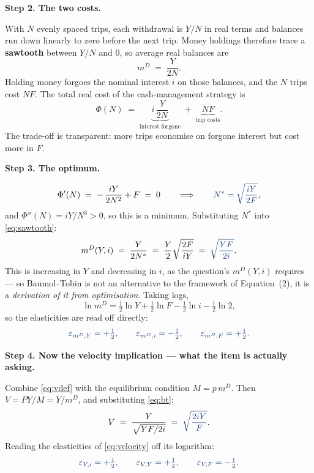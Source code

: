 \documentclass[11pt, a4paper]{article}
\newcommand{\passo}[1]{\medskip\noindent\textbf{#1}\par\nobreak}
\newcommand{\resp}[1]{%
  \ifmmode {\color{darkblue}#1}\else\textcolor{darkblue}{\textbf{#1}}\fi}
\newcommand{\md}{m^{D}}
\newcommand{\Nst}{N^{\ast}}
\begin{document}
\passo{Step 2. The two costs.}
With $N$ evenly spaced trips, each withdrawal is $Y/N$ in real terms and balances run down
linearly to zero before the next trip. Money holdings therefore trace a \textbf{sawtooth}
between $Y/N$ and $0$, so average real balances are
\begin{equation}
\md \;=\; \frac{Y}{2N}.
\label{eq:sawtooth}
\end{equation}
Holding money forgoes the nominal interest $i$ on those balances, and the $N$ trips cost $NF$.
The total real cost of the cash-management strategy is
\begin{equation}
\Phi(N) \;=\; \underbrace{i\,\frac{Y}{2N}}_{\text{interest forgone}} \;+\; \underbrace{NF}_{\text{trip costs}}.
\label{eq:cost}
\end{equation}
The trade-off is transparent: more trips economise on forgone interest but cost more in $F$.

\passo{Step 3. The optimum.}
\[
\Phi'(N) \;=\; -\,\frac{iY}{2N^{2}} + F \;=\; 0
\qquad\Longrightarrow\qquad
\resp{\Nst=\sqrt{\dfrac{iY}{2F}}},
\]
and $\Phi''(N)=iY/N^{3}>0$, so this is a minimum. Substituting $\Nst$ into
\eqref{eq:sawtooth}:
\begin{equation}
\md(Y,i) \;=\; \frac{Y}{2\Nst} \;=\; \frac{Y}{2}\sqrt{\frac{2F}{iY}}
\;=\; \resp{\sqrt{\frac{YF}{2i}}}.
\label{eq:bt}
\end{equation}
This is increasing in $Y$ and decreasing in $i$, as the question's $\md(Y,i)$ requires --- so
Baumol--Tobin is not an alternative to the framework of Equation~(2), it is a \emph{derivation
of it from optimisation}. Taking logs,
\[
\ln \md = \tfrac12\ln Y + \tfrac12 \ln F - \tfrac12\ln i - \tfrac12\ln 2,
\]
so the elasticities are read off directly:
\begin{equation}
\resp{\varepsilon_{\md,Y}=+\tfrac12,\qquad
\varepsilon_{\md,i}=-\tfrac12,\qquad
\varepsilon_{\md,F}=+\tfrac12 .}
\label{eq:elast}
\end{equation}

\passo{Step 4. Now the velocity implication --- what the item is actually asking.}
Combine \eqref{eq:vdef} with the equilibrium condition $M=p\,\md$. Then $V=PY/M=Y/\md$, and
substituting \eqref{eq:bt}:
\begin{equation}
V \;=\; \frac{Y}{\sqrt{YF/2i}} \;=\; \resp{\sqrt{\frac{2iY}{F}}}.
\label{eq:velocity}
\end{equation}
Reading the elasticities of \eqref{eq:velocity} off its logarithm:
\begin{equation}
\resp{\varepsilon_{V,i}=+\tfrac12,\qquad
\varepsilon_{V,Y}=+\tfrac12,\qquad
\varepsilon_{V,F}=-\tfrac12 .}
\end{equation}
\end{document}
